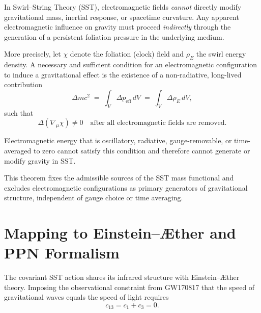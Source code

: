 \documentclass[11pt]{article}
\begin{document}
        \begin{theorem}
            \label{thm:EM_no_gravity}

            In Swirl--String Theory (SST), electromagnetic fields \emph{cannot} directly modify
            gravitational mass, inertial response, or spacetime curvature.
            Any apparent electromagnetic influence on gravity must proceed
            \emph{indirectly} through the generation of a persistent foliation
            pressure in the underlying medium.

            More precisely, let $\chi$ denote the foliation (clock) field and
            $\rho_{\!E}$ the swirl energy density.
            A necessary and sufficient condition for an electromagnetic configuration
            to induce a gravitational effect is the existence of a non-radiative,
            long-lived contribution
            \begin{equation}
                \Delta m c^2
                \;=\;
                \int_V \Delta p_{\mathrm{eff}} \, dV
                \;=\;
                \int_V \Delta \rho_{\!E} \, dV ,
            \end{equation}
            such that
            \begin{equation}
                \Delta(\nabla_\mu \chi) \neq 0
                \quad\text{after all electromagnetic fields are removed.}
            \end{equation}

            Electromagnetic energy that is oscillatory, radiative, gauge-removable,
            or time-averaged to zero cannot satisfy this condition and therefore
            cannot generate or modify gravity in SST.

        \end{theorem}

        This theorem fixes the admissible sources of the SST mass functional
        and excludes electromagnetic configurations as primary generators
        of gravitational structure, independent of gauge choice or time averaging.



    \section{Mapping to Einstein--\AE ther and PPN Formalism}

        The covariant SST action shares its infrared structure with Einstein--\AE ther theory.
        Imposing the observational constraint from GW170817 that the speed of gravitational
        waves equals the speed of light requires
        \begin{equation}
            c_{13} = c_1 + c_3 = 0 .
        \end{equation}
\end{document}
